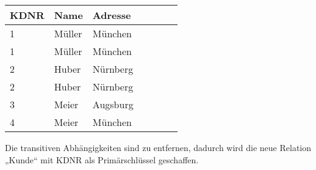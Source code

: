 \documentclass{lehramt-informatik-haupt}
\begin{document}
\begin{enumerate}
\begin{antwort}
\begin{tabular}{|l|l|l|l|l|l|l|}
\textbf{KDNR} & \textbf{Name} & \textbf{Adresse}
\\\hline
1    & Müller & München       \\
1    & Müller & München       \\
2    & Huber  & Nürnberg      \\
2    & Huber  & Nürnberg      \\
3    & Meier  & Augsburg      \\
4    & Meier  & München
\end{tabular}

Die transitiven Abhängigkeiten sind zu entfernen, dadurch wird die neue
Relation „Kunde“ mit KDNR als Primärschlüssel geschaffen.
\end{antwort}

\end{enumerate}

\literatur
\end{document}
